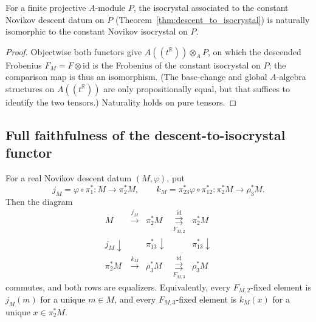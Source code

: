 \begin{proposition}
  \label{prop:descent_isoc_constant_compat}
  \leanok
  For a finite projective $A$-module $P$, the isocrystal associated to the
  constant Novikov descent datum on $P$ (Theorem~\ref{thm:descent_to_isocrystal})
  is naturally isomorphic to the constant Novikov isocrystal on $P$.
\end{proposition}

\begin{proof}
  \leanok
  Objectwise both functors give $A((t^{\mathbb{R}})) \otimes_A P$, on which the
  descended Frobenius $F_M = F \otimes \mathrm{id}$ is the Frobenius of the
  constant isocrystal on $P$; the comparison map is thus an isomorphism.
  (The base-change and global $A$-algebra structures on $A((t^{\mathbb{R}}))$ are
  only propositionally equal, but that suffices to identify the two tensors.)
  Naturality holds on pure tensors.
\end{proof}

\subsection{Full faithfulness of the descent-to-isocrystal functor}

\begin{lemma}
  \label{lem:recover_dd_from_isoc}
  \leanok
  For a real Novikov descent datum $(M,\varphi)$, put
  \[
    j_M=\varphi\circ\pi_1^\ast\colon M\to\pi_2^\ast M,
    \qquad
    k_M=\pi_{23}^\ast\varphi\circ\pi_{12}^\ast
      \colon\pi_2^\ast M\to\rho_3^\ast M.
  \]
  Then the diagram
  \[
    \begin{array}{ccccc}
      M & \xrightarrow{j_M} & \pi_2^\ast M
        & \overset{\mathrm{id}}{\underset{F_{M,2}}{\rightrightarrows}}
        & \pi_2^\ast M \\
      {\scriptstyle j_M}\!\downarrow && {\scriptstyle\pi_{13}^\ast}\!\downarrow
        && {\scriptstyle\pi_{13}^\ast}\!\downarrow \\
      \pi_2^\ast M & \xrightarrow{k_M} & \rho_3^\ast M
        & \overset{\mathrm{id}}{\underset{F_{M,3}}{\rightrightarrows}}
        & \rho_3^\ast M
    \end{array}
  \]
  commutes, and both rows are equalizers.  Equivalently, every
  $F_{M,2}$-fixed element is $j_M(m)$ for a unique $m\in M$, and every
  $F_{M,3}$-fixed element is $k_M(x)$ for a unique $x\in\pi_2^\ast M$.
\end{lemma}

